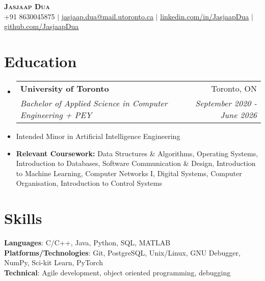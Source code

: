 \documentclass[letterpaper,11pt]{article}
\makeatletter
\newcommand{\resumeItem}[1]{
  \item\small{
    {#1 \vspace{-2pt}}
  }
}
\newcommand{\resumeSubheading}[4]{
  \vspace{-2pt}\item
    \begin{tabular*}{0.97\textwidth}[t]{l@{\extracolsep{\fill}}r}
      \textbf{#1} & #2 \\
      \textit{\small#3} & \textit{\small #4} \\
    \end{tabular*}\vspace{-7pt}
}
\newcommand{\resumeSubItem}[1]{\resumeItem{#1}\vspace{-4pt}}
\newcommand{\resumeSubHeadingListStart}{\begin{itemize}[leftmargin=0.15in, label={}]}
\newcommand{\resumeSubHeadingListEnd}{\end{itemize}}
\makeatother
\begin{document}


\begin{center}
  \textbf{\Huge \scshape Jasjaap Dua} \\ \vspace{1pt}
  \small +91 8630045875 $|$ \href{mailto:jasjaap.dua@mail.utoronto.ca}{\underline{jasjaap.dua@mail.utoronto.ca}} $|$ 
  \href{https://linkedin.com/in/JasjaapDua}{\underline{linkedin.com/in/JasjaapDua}} $|$
  \href{https://github.com/JasjaapDua}{\underline{github.com/JasjaapDua}}
\end{center}




\section{Education}
      \resumeSubHeadingListStart
        \resumeSubheading
          {University of Toronto}{Toronto, ON}
          {Bachelor of Applied Science in Computer Engineering + PEY}{September 2020 - June 2026}
        \resumeSubItem{Intended Minor in Artificial Intelligence Engineering}
        \resumeSubItem{\textbf{Relevant Coursework: }Data Structures \& Algorithms, Operating Systems, Introduction to Databases, Software Communication \& Design, Introduction to Machine Learning, Computer Networks I, Digital Systems, Computer Organisation, Introduction to Control Systems}
      \resumeSubHeadingListEnd
  
\section{Skills}
 \begin{itemize}[leftmargin=0.15in, label={}]
    \small{\item{
     \textbf{Languages}{: C/C++, Java, Python, SQL, MATLAB} \\
     \textbf{Platforms/Technologies}{: Git, PostgreSQL, Unix/Linux, GNU Debugger, NumPy, Sci-kit Learn, PyTorch} \\
     \textbf{Technical}{: Agile development, object oriented programming, debugging}
    }}
 \end{itemize}
\end{document}
